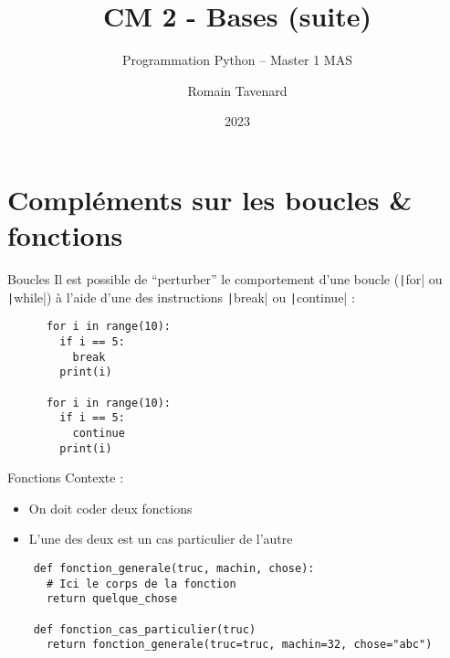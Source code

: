 \documentclass[10pt]{beamer}
\title[M1 MAS -- Python -- Bases (suite)]{CM 2 - Bases (suite)}
\subtitle{Programmation Python -- Master 1 MAS}
\author{Romain Tavenard}
\date{2023}
\institute{%
\hypersetup{urlcolor=.}
\makebox[2.2ex][c]{\faEnvelope}\enspace\href{mailto:romain.tavenard@univ-rennes2.fr}{\texttt{romain.tavenard@univ-rennes2.fr}}\\%
}
\begin{document}
\maketitle

\section{Compléments sur les boucles \& fonctions}

\begin{frame}[fragile]{Boucles}  
  Il est possible de ``perturber'' le comportement d'une boucle (\texttt|for| ou \texttt|while|) à l'aide d'une des instructions \texttt|break| ou \texttt|continue| :

  \begin{beamercodeblock}
    \begin{verbatim}
      for i in range(10):
        if i == 5:
          break
        print(i)
      
      for i in range(10):
        if i == 5:
          continue
        print(i)
    \end{verbatim}
  \end{beamercodeblock}
\end{frame}

\begin{frame}[fragile]{Fonctions}  
  Contexte :

  \begin{itemize}
    \item On doit coder deux fonctions
    \item L'une des deux est un cas particulier de l'autre
  \end{itemize}

  \begin{beamercodeblock}
    \begin{verbatim}
    def fonction_generale(truc, machin, chose):
      # Ici le corps de la fonction
      return quelque_chose
    
    def fonction_cas_particulier(truc)
      return fonction_generale(truc=truc, machin=32, chose="abc")
    \end{verbatim}
  \end{beamercodeblock}
\end{frame}
\end{document}
